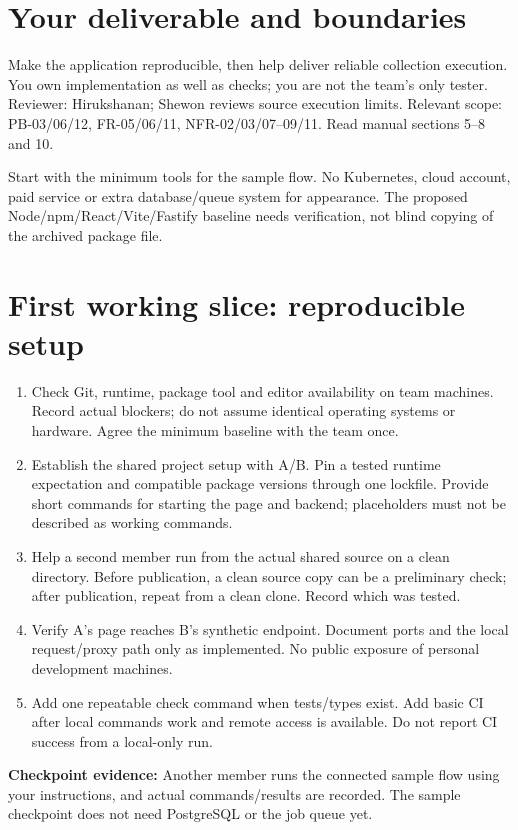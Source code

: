 
\sharedintro
\section*{Your deliverable and boundaries}
Make the application reproducible, then help deliver reliable collection execution. You own implementation as well as checks; you are not the team's only tester. Reviewer: Hirukshanan; Shewon reviews source execution limits. Relevant scope: PB-03/06/12, FR-05/06/11, NFR-02/03/07--09/11. Read manual sections 5--8 and 10.

Start with the minimum tools for the sample flow. No Kubernetes, cloud account, paid service or extra database/queue system for appearance. The proposed Node/npm/React/Vite/Fastify baseline needs verification, not blind copying of the archived package file.
\section*{First working slice: reproducible setup}
\begin{enumerate}
\item Check Git, runtime, package tool and editor availability on team machines. Record actual blockers; do not assume identical operating systems or hardware. Agree the minimum baseline with the team once.
\item Establish the shared project setup with A/B. Pin a tested runtime expectation and compatible package versions through one lockfile. Provide short commands for starting the page and backend; placeholders must not be described as working commands.
\item Help a second member run from the actual shared source on a clean directory. Before publication, a clean source copy can be a preliminary check; after publication, repeat from a clean clone. Record which was tested.
\item Verify A's page reaches B's synthetic endpoint. Document ports and the local request/proxy path only as implemented. No public exposure of personal development machines.
\item Add one repeatable check command when tests/types exist. Add basic CI after local commands work and remote access is available. Do not report CI success from a local-only run.
\end{enumerate}
\textbf{Checkpoint evidence:} Another member runs the connected sample flow using your instructions, and actual commands/results are recorded. The sample checkpoint does not need PostgreSQL or the job queue yet.
\newpage
